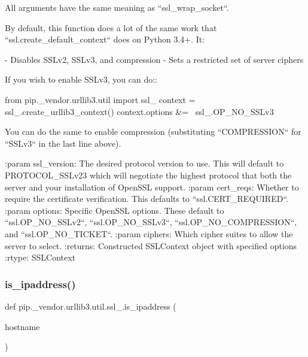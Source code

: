 \begin{DoxyVerb}All arguments have the same meaning as ``ssl_wrap_socket``.

By default, this function does a lot of the same work that
``ssl.create_default_context`` does on Python 3.4+. It:

- Disables SSLv2, SSLv3, and compression
- Sets a restricted set of server ciphers

If you wish to enable SSLv3, you can do::

    from pip._vendor.urllib3.util import ssl_
    context = ssl_.create_urllib3_context()
    context.options &= ~ssl_.OP_NO_SSLv3

You can do the same to enable compression (substituting ``COMPRESSION``
for ``SSLv3`` in the last line above).

:param ssl_version:
    The desired protocol version to use. This will default to
    PROTOCOL_SSLv23 which will negotiate the highest protocol that both
    the server and your installation of OpenSSL support.
:param cert_reqs:
    Whether to require the certificate verification. This defaults to
    ``ssl.CERT_REQUIRED``.
:param options:
    Specific OpenSSL options. These default to ``ssl.OP_NO_SSLv2``,
    ``ssl.OP_NO_SSLv3``, ``ssl.OP_NO_COMPRESSION``, and ``ssl.OP_NO_TICKET``.
:param ciphers:
    Which cipher suites to allow the server to select.
:returns:
    Constructed SSLContext object with specified options
:rtype: SSLContext
\end{DoxyVerb}
 \mbox{\label{namespacepip_1_1__vendor_1_1urllib3_1_1util_1_1ssl___a24009fbf006a446a999c0b2d18a1f8ad}} 
\subsubsection{\texorpdfstring{is\+\_\+ipaddress()}{is\_ipaddress()}}
{\footnotesize\ttfamily def pip.\+\_\+vendor.\+urllib3.\+util.\+ssl\+\_\+.\+is\+\_\+ipaddress (\begin{DoxyParamCaption}\item[{}]{hostname }\end{DoxyParamCaption})}

